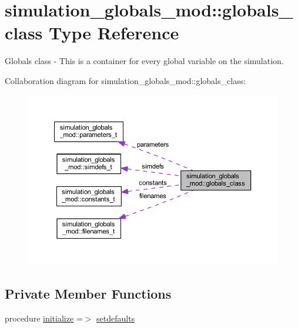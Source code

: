 \hypertarget{structsimulation__globals__mod_1_1globals__class}{}\section{simulation\+\_\+globals\+\_\+mod\+:\+:globals\+\_\+class Type Reference}
\label{structsimulation__globals__mod_1_1globals__class}


Globals class -\/ This is a container for every global variable on the simulation.  




Collaboration diagram for simulation\+\_\+globals\+\_\+mod\+:\+:globals\+\_\+class\+:\nopagebreak
\begin{figure}[H]
\begin{center}
\leavevmode
\includegraphics[width=350pt]{structsimulation__globals__mod_1_1globals__class__coll__graph}
\end{center}
\end{figure}
\subsection*{Private Member Functions}
\begin{DoxyCompactItemize}
\item 
procedure \hyperlink{structsimulation__globals__mod_1_1globals__class_a9438f8bdec469e7cbf9b898a398f9745}{initialize} =$>$ \hyperlink{namespacesimulation__globals__mod_ac2ac06271de377004c67b6ba2f3ed353}{setdefaults}
\end{DoxyCompactItemize}
